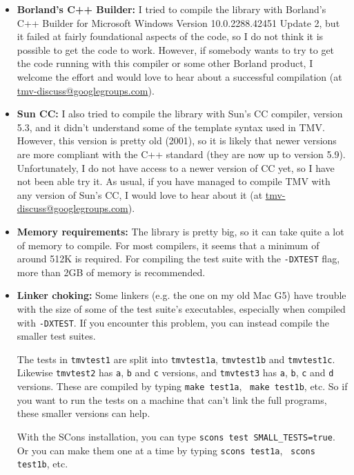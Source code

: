 \documentclass[twoside,letterpaper,11pt]{article}
\makeatletter
\newcommand{\mygroupx}{tmv-discuss@googlegroups.com}
\newcommand{\mygroup}{\href{mailto:\mygroupx}{\mygroupx}}
\makeatother
\begin{document}
\begin{itemize}
\begin{itemize}
\end{itemize}

\item {\bf Borland's C++ Builder:}
I tried to compile the library with Borland's C++ Builder for Microsoft Windows
Version 10.0.2288.42451 Update 2, but it failed at fairly foundational aspects of the 
code, so I do not think it is possible to get the code to work.  However, if somebody wants
to try to get the code running with this compiler or some other Borland product, 
I welcome the effort and would
love to hear about a successful compilation (at \mygroup).

\item {\bf Sun CC:}
I also tried to compile the library with Sun's CC compiler, version 5.3, 
and it didn't understand some of the template syntax used in TMV.  However,
this version is pretty old (2001), so it is likely that newer versions are more
compliant with the C++ standard (they are now up to version 5.9).  
Unfortunately, I do not have access to a newer version of CC yet, so I have not
been able try it.  As usual, if you have managed to compile TMV with
any version of Sun's CC, I would love to hear about it (at \mygroup).

\item {\bf Memory requirements:}
The library is pretty big, so it can take quite a lot of memory to compile. 
For most compilers, it seems that a minimum of around 512K is required.
For compiling the test suite with the \texttt{-DXTEST} flag, more than 
2GB of memory is recommended.

\item {\bf Linker choking:}
Some linkers (e.g. the one on my old Mac G5) have trouble with the size 
of some of the test suite's executables, especially when compiled 
with \texttt{-DXTEST}.  If you encounter this problem, you can instead
compile the smaller test suites.  

The tests
in \texttt{tmvtest1} are split into \texttt{tmvtest1a}, \texttt{tmvtest1b} and \texttt{tmvtest1c}.
Likewise \texttt{tmvtest2} has \texttt{a}, \texttt{b} and \texttt{c} versions, and \texttt{tmvtest3}
has \texttt{a}, \texttt{b}, \texttt{c} and \texttt{d} versions.  These are 
compiled by typing \texttt{make test1a},~ \texttt{make test1b}, etc.  So if you want
to run the tests on a machine that can't link the full programs, these
smaller versions can help.   

With the SCons installation, you can 
type \texttt{scons test SMALL\_TESTS=true}.  Or you can make them one
at a time by typing \texttt{scons test1a},~ \texttt{scons test1b}, etc.


\end{itemize}
\end{document}
